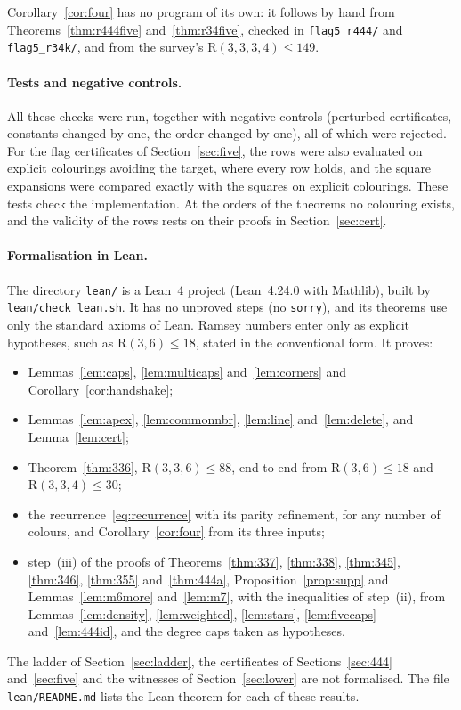 \documentclass[11pt]{article}
\theoremstyle{spacedplain}
\theoremstyle{spaceddef}
\theoremstyle{spacedremark}
\newcommand{\R}{\mathrm{R}}
\begin{document}
Corollary~\ref{cor:four} has no program of its own: it follows by hand from Theorems~\ref{thm:r444five} and~\ref{thm:r34five}, checked in \texttt{flag5\_r444/} and \texttt{flag5\_r34k/}, and from the survey's $\R(3,3,3,4)\le 149$.

\paragraph{Tests and negative controls.}
All these checks were run, together with negative controls (perturbed certificates, constants changed by one, the order changed by one), all of which were rejected.
For the flag certificates of Section~\ref{sec:five}, the rows were also evaluated on explicit colourings avoiding the target, where every row holds, and the square expansions were compared exactly with the squares on explicit colourings.
These tests check the implementation.
At the orders of the theorems no colouring exists, and the validity of the rows rests on their proofs in Section~\ref{sec:cert}.

\paragraph{Formalisation in Lean.}
The directory \texttt{lean/} is a Lean~4 project (Lean~4.24.0 with Mathlib), built by \texttt{lean/check\_lean.sh}.
It has no unproved steps (no \texttt{sorry}), and its theorems use only the standard axioms of Lean.
Ramsey numbers enter only as explicit hypotheses, such as $\R(3,6)\le 18$, stated in the conventional form.
It proves:
\begin{itemize}
\item Lemmas~\ref{lem:caps}, \ref{lem:multicaps} and~\ref{lem:corners} and Corollary~\ref{cor:handshake};
\item Lemmas~\ref{lem:apex}, \ref{lem:commonnbr}, \ref{lem:line} and~\ref{lem:delete}, and Lemma~\ref{lem:cert};
\item Theorem~\ref{thm:336}, $\R(3,3,6)\le 88$, end to end from $\R(3,6)\le 18$ and $\R(3,3,4)\le 30$;
\item the recurrence~\eqref{eq:recurrence} with its parity refinement, for any number of colours, and Corollary~\ref{cor:four} from its three inputs;
\item step~(iii) of the proofs of Theorems~\ref{thm:337}, \ref{thm:338}, \ref{thm:345}, \ref{thm:346}, \ref{thm:355} and~\ref{thm:444a}, Proposition~\ref{prop:supp} and Lemmas~\ref{lem:m6more} and~\ref{lem:m7}, with the inequalities of step~(ii), from Lemmas~\ref{lem:density}, \ref{lem:weighted}, \ref{lem:stars}, \ref{lem:fivecaps} and~\ref{lem:444id}, and the degree caps taken as hypotheses.
\end{itemize}
The ladder of Section~\ref{sec:ladder}, the certificates of Sections~\ref{sec:444} and~\ref{sec:five} and the witnesses of Section~\ref{sec:lower} are not formalised.
The file \texttt{lean/README.md} lists the Lean theorem for each of these results.
\end{document}
